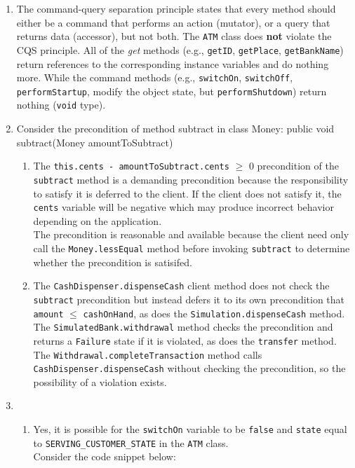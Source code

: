 \documentclass{report}
\begin{document}
\begin{enumerate}
	\item The command-query separation principle states that every method should either be a command that performs an action
	(mutator), or a query that returns data (accessor), but not both. The \texttt{ATM} class does \textbf{not} violate the CQS principle.
	All of the \textit{get} methods (e.g., \texttt{getID},
	\texttt{getPlace}, \texttt{getBankName}) return references to the
	corresponding instance variables and do nothing more. While the
    command	methods (e.g., \texttt{switchOn}, \texttt{switchOff},
	\texttt{performStartup}, modify the object state, but \texttt{performShutdown}) return nothing (\texttt{void} type).
		
	\item Consider the precondition of method subtract in class Money:
	public void subtract(Money amountToSubtract)
	\begin{enumerate}
	    \item The \texttt{this.cents - amountToSubtract.cents} $\geq$ 0 precondition of the \texttt{subtract} method
	    is a demanding precondition because the responsibility
	    to satisfy it is deferred to the client. If the client
	    does not satisfy it, the \texttt{cents} variable will
	    be negative which may produce incorrect behavior
	    depending on the application.\\
	    The precondition is reasonable and available because
	    the client need only call the \texttt{Money.lessEqual}
	    method before invoking \texttt{subtract} to determine
	    whether the precondition is satisifed.
	    
	    \item The \texttt{CashDispenser.dispenseCash} client
	    method does not check the \\ \texttt{subtract} precondition
	    but instead defers it to its own precondition that
	    \texttt{amount} $\leq$ \texttt{cashOnHand}, as does
	    the \texttt{Simulation.dispenseCash} method. The
	    \texttt{SimulatedBank.withdrawal} method checks the
	    precondition and returns a \texttt{Failure} state if
	    it is violated, as does the \texttt{transfer} method.
	    The \texttt{Withdrawal.completeTransaction} method calls \\
	    \texttt{CashDispenser.dispenseCash} without checking
	    the precondition, so the possibility of a violation
	    exists.
	\end{enumerate}
	
	\item 
	\begin{enumerate}
		\item Yes, it is possible for the \texttt{switchOn} variable to be
		\texttt{false} and \texttt{state} equal to
		\texttt{SERVING\_CUSTOMER\_STATE} in the \texttt{ATM} class. \\
		Consider the code snippet below:
				

\end{enumerate}
\end{enumerate}
\end{document}
